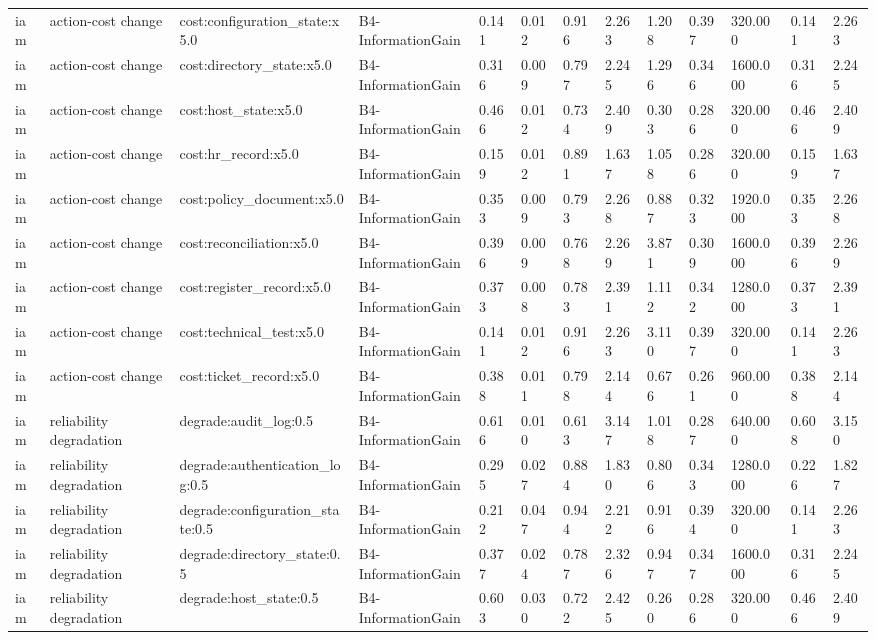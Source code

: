 \begin{table}[!ht]
{\begin{tabular}{lllllllllllll}
iam & action-cost change & cost:configuration\_state:x5.0 & B4-InformationGain & 0.141 & 0.012 & 0.916 & 2.263 & 1.208 & 0.397 & 320.000 & 0.141 & 2.263 \\
iam & action-cost change & cost:directory\_state:x5.0 & B4-InformationGain & 0.316 & 0.009 & 0.797 & 2.245 & 1.296 & 0.346 & 1600.000 & 0.316 & 2.245 \\
iam & action-cost change & cost:host\_state:x5.0 & B4-InformationGain & 0.466 & 0.012 & 0.734 & 2.409 & 0.303 & 0.286 & 320.000 & 0.466 & 2.409 \\
iam & action-cost change & cost:hr\_record:x5.0 & B4-InformationGain & 0.159 & 0.012 & 0.891 & 1.637 & 1.058 & 0.286 & 320.000 & 0.159 & 1.637 \\
iam & action-cost change & cost:policy\_document:x5.0 & B4-InformationGain & 0.353 & 0.009 & 0.793 & 2.268 & 0.887 & 0.323 & 1920.000 & 0.353 & 2.268 \\
iam & action-cost change & cost:reconciliation:x5.0 & B4-InformationGain & 0.396 & 0.009 & 0.768 & 2.269 & 3.871 & 0.309 & 1600.000 & 0.396 & 2.269 \\
iam & action-cost change & cost:register\_record:x5.0 & B4-InformationGain & 0.373 & 0.008 & 0.783 & 2.391 & 1.112 & 0.342 & 1280.000 & 0.373 & 2.391 \\
iam & action-cost change & cost:technical\_test:x5.0 & B4-InformationGain & 0.141 & 0.012 & 0.916 & 2.263 & 3.110 & 0.397 & 320.000 & 0.141 & 2.263 \\
iam & action-cost change & cost:ticket\_record:x5.0 & B4-InformationGain & 0.388 & 0.011 & 0.798 & 2.144 & 0.676 & 0.261 & 960.000 & 0.388 & 2.144 \\
iam & reliability degradation & degrade:audit\_log:0.5 & B4-InformationGain & 0.616 & 0.010 & 0.613 & 3.147 & 1.018 & 0.287 & 640.000 & 0.608 & 3.150 \\
iam & reliability degradation & degrade:authentication\_log:0.5 & B4-InformationGain & 0.295 & 0.027 & 0.884 & 1.830 & 0.806 & 0.343 & 1280.000 & 0.226 & 1.827 \\
iam & reliability degradation & degrade:configuration\_state:0.5 & B4-InformationGain & 0.212 & 0.047 & 0.944 & 2.212 & 0.916 & 0.394 & 320.000 & 0.141 & 2.263 \\
iam & reliability degradation & degrade:directory\_state:0.5 & B4-InformationGain & 0.377 & 0.024 & 0.787 & 2.326 & 0.947 & 0.347 & 1600.000 & 0.316 & 2.245 \\
iam & reliability degradation & degrade:host\_state:0.5 & B4-InformationGain & 0.603 & 0.030 & 0.722 & 2.425 & 0.260 & 0.286 & 320.000 & 0.466 & 2.409 \\

\end{tabular}}
\end{table}
